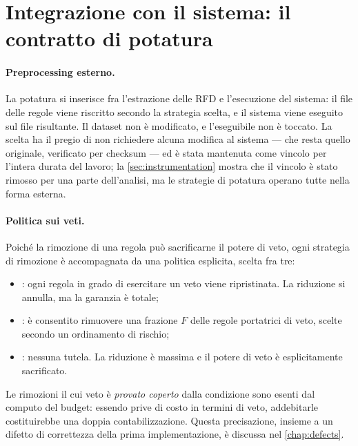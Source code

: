 \section{Integrazione con il sistema: il contratto di potatura}\label{sec:integration}

\paragraph{Preprocessing esterno.} La potatura si inserisce fra l'estrazione delle RFD e
l'esecuzione del sistema: il file delle regole viene riscritto secondo la strategia scelta, e il
sistema viene eseguito sul file risultante. Il dataset non è modificato, e l'eseguibile non è
toccato. La scelta ha il pregio di non richiedere alcuna modifica al sistema --- che resta quello
originale, verificato per checksum --- ed è stata mantenuta come vincolo per l'intera durata del
lavoro; la \autoref{sec:instrumentation} mostra che il vincolo è stato rimosso per una parte
dell'analisi, ma le strategie di potatura operano tutte nella forma esterna.

\paragraph{Politica sui veti.}\label{sec:veto-policy}
Poiché la rimozione di una regola può sacrificarne il potere di veto, ogni strategia di rimozione
è accompagnata da una politica esplicita, scelta fra tre:

\begin{itemize}[leftmargin=1.4em]
    \item {}: ogni regola in grado di esercitare un veto viene ripristinata. La
    riduzione si annulla, ma la garanzia è totale;
    \item {}: è consentito rimuovere una frazione $F$ delle regole portatrici di veto,
    scelte secondo un ordinamento di rischio;
    \item {}: nessuna tutela. La riduzione è massima e il potere di veto è
    esplicitamente sacrificato.
\end{itemize}

Le rimozioni il cui veto è \emph{provato coperto} dalla condizione \Vtwo{} sono esenti dal
computo del budget: essendo prive di costo in termini di veto, addebitarle costituirebbe una
doppia contabilizzazione. Questa precisazione, insieme a un difetto di correttezza della prima
implementazione, è discussa nel \autoref{chap:defects}.

